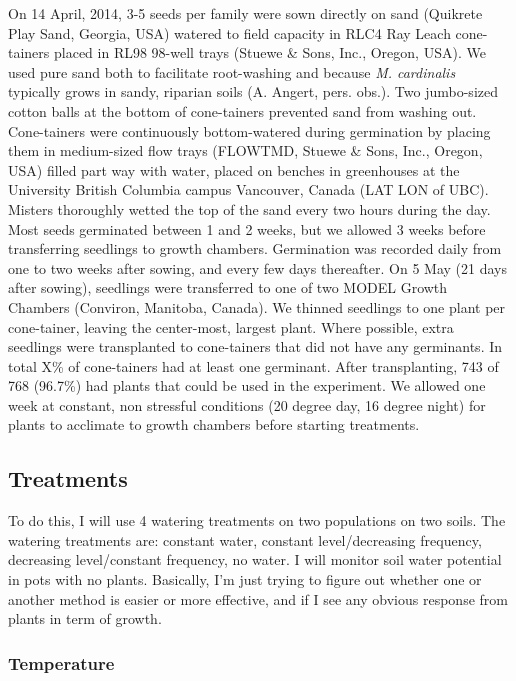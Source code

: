\documentclass[11pt, oneside]{article}
\begin{document}
On 14 April, 2014, 3-5 seeds per family were sown directly on sand (Quikrete Play Sand, Georgia, USA) watered to field capacity in RLC4 Ray Leach cone-tainers placed in RL98 98-well trays (Stuewe \& Sons, Inc., Oregon, USA). We used pure sand both to facilitate root-washing and because \textit{M. cardinalis} typically grows in sandy, riparian soils (A. Angert, pers. obs.). Two jumbo-sized cotton balls at the bottom of cone-tainers prevented sand from washing out. Cone-tainers were continuously bottom-watered during germination by placing them in medium-sized flow trays (FLOWTMD, Stuewe \& Sons, Inc., Oregon, USA) filled part way with water, placed on benches in greenhouses at the University British Columbia campus Vancouver, Canada (LAT LON of UBC). Misters thoroughly wetted the top of the sand every two hours during the day. Most seeds germinated between 1 and 2 weeks, but we allowed 3 weeks before transferring seedlings to growth chambers. Germination was recorded daily from one to two weeks after sowing, and every few days thereafter. On 5 May (21 days after sowing), seedlings were transferred to one of two MODEL Growth Chambers (Conviron, Manitoba, Canada). We thinned seedlings to one plant per cone-tainer, leaving the center-most, largest plant. Where possible, extra seedlings were transplanted to cone-tainers that did not have any germinants. In total X\% of cone-tainers had at least one germinant. After transplanting, 743 of 768 (96.7\%) had plants that could be used in the experiment. We allowed one week at constant, non stressful conditions (20 degree day, 16 degree night) for plants to acclimate to growth chambers before starting treatments.

\subsection*{Treatments}

To do this, I will use 4 watering treatments on two populations on two soils. The watering treatments are: constant water, constant level/decreasing frequency, decreasing level/constant frequency, no water. I will monitor soil water potential in pots with no plants. Basically, I'm just trying to figure out whether one or another method is easier or more effective, and if I see any obvious response from plants in term of growth.

\subsubsection*{Temperature}
\end{document}
